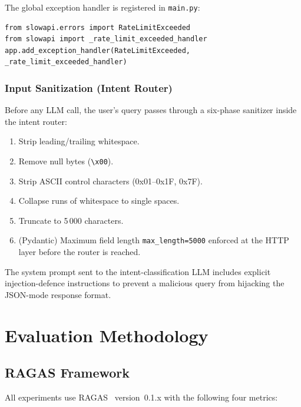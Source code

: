 \documentclass[12pt,a4paper]{article}
\begin{document}
The global exception handler is registered in \texttt{main.py}:

\begin{verbatim}
from slowapi.errors import RateLimitExceeded
from slowapi import _rate_limit_exceeded_handler
app.add_exception_handler(RateLimitExceeded, _rate_limit_exceeded_handler)
\end{verbatim}

\subsubsection*{Input Sanitization (Intent Router)}

Before any LLM call, the user's query passes through a six-phase sanitizer inside the intent router:

\begin{enumerate}
  \item Strip leading/trailing whitespace.
  \item Remove null bytes (\texttt{\textbackslash x00}).
  \item Strip ASCII control characters (0x01--0x1F, 0x7F).
  \item Collapse runs of whitespace to single spaces.
  \item Truncate to 5\,000 characters.
  \item (Pydantic) Maximum field length \texttt{max\_length=5000} enforced at the HTTP layer before the router is reached.
\end{enumerate}

The system prompt sent to the intent-classification LLM includes explicit injection-defence instructions to prevent a malicious query from hijacking the JSON-mode response format.

\section{Evaluation Methodology}

\subsection{RAGAS Framework}

All experiments use RAGAS~\cite{es2023ragas} version~0.1.x with the following four metrics:
\end{document}
